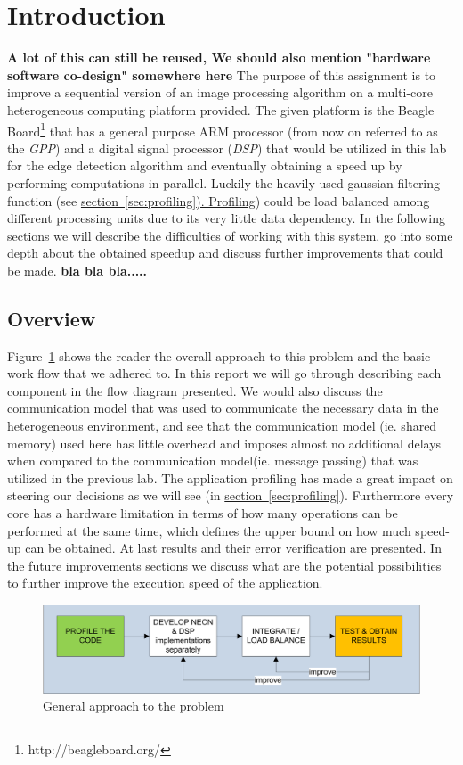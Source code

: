 \section{Introduction}
\textbf{A lot of this can still be reused,  We should also mention "hardware software co-design" somewhere here}
The purpose of this assignment is to improve a sequential version of an image processing algorithm on a multi-core heterogeneous computing platform provided. The given platform is the Beagle Board\footnote{http://beagleboard.org/} that has a general purpose ARM processor (from now on referred to as the \emph{GPP}) and a digital signal processor (\emph{DSP}) that would be utilized in this lab for the edge detection algorithm and eventually obtaining a speed up by performing computations in parallel. Luckily the heavily used gaussian filtering function (see \hyperref[sec:profiling]{section~\ref{sec:profiling}). Profiling}) could be load balanced among different processing units due to its very little data dependency. In the following sections we will describe the difficulties of working with this system, go into some depth about the obtained speedup and discuss further improvements that could be made.
\textbf{bla bla bla..... }

\subsection{Overview}
Figure~\ref{fig:workflow} shows the reader the overall approach to this problem and the basic work flow that we adhered to. In this report we will go through describing each component in the flow diagram presented. We would also discuss the communication model that was used to communicate the necessary data in the heterogeneous environment, and see that the communication model (ie. shared memory) used here has little overhead and imposes almost no additional delays when compared to the communication model(ie. message passing) that was utilized in the previous lab. The application profiling has made a great impact on steering our decisions as we will see (in \hyperref[sec:profiling]{section~\ref{sec:profiling}}). Furthermore every core has a hardware limitation in terms of how many operations can be performed at the same time, which defines the upper bound on how much speed-up can be obtained. At last results and their error verification are presented. In the future improvements sections we discuss what are the potential possibilities to further improve the execution speed of the application.

\begin{figure}
\includegraphics[width=\linewidth]{drawings/workflow}
\caption{General approach to the problem}
\label{fig:workflow}
\end{figure}



